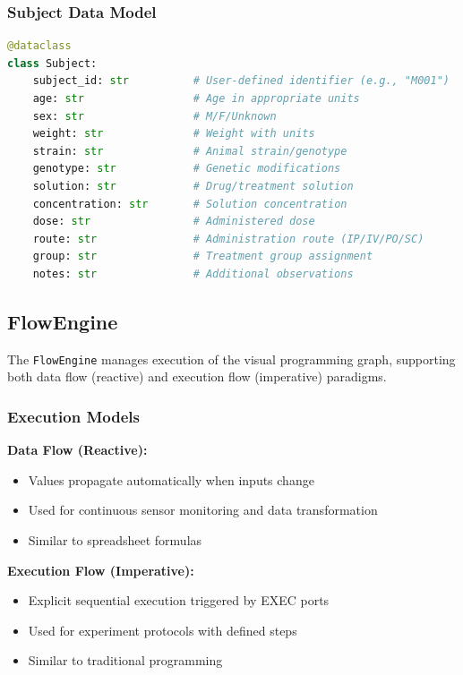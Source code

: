 \documentclass[11pt,a4paper]{article}
\begin{document}
\subsubsection{Subject Data Model}

\begin{lstlisting}[language=Python]
@dataclass
class Subject:
    subject_id: str          # User-defined identifier (e.g., "M001")
    age: str                 # Age in appropriate units
    sex: str                 # M/F/Unknown
    weight: str              # Weight with units
    strain: str              # Animal strain/genotype
    genotype: str            # Genetic modifications
    solution: str            # Drug/treatment solution
    concentration: str       # Solution concentration
    dose: str                # Administered dose
    route: str               # Administration route (IP/IV/PO/SC)
    group: str               # Treatment group assignment
    notes: str               # Additional observations
\end{lstlisting}

\subsection{FlowEngine}

The \texttt{FlowEngine} manages execution of the visual programming graph, supporting both data flow (reactive) and execution flow (imperative) paradigms.

\subsubsection{Execution Models}

\textbf{Data Flow (Reactive):}
\begin{itemize}    \item Values propagate automatically when inputs change
    \item Used for continuous sensor monitoring and data transformation
    \item Similar to spreadsheet formulas
\end{itemize}

\textbf{Execution Flow (Imperative):}
\begin{itemize}    \item Explicit sequential execution triggered by EXEC ports
    \item Used for experiment protocols with defined steps
    \item Similar to traditional programming
\end{itemize}
\end{document}
